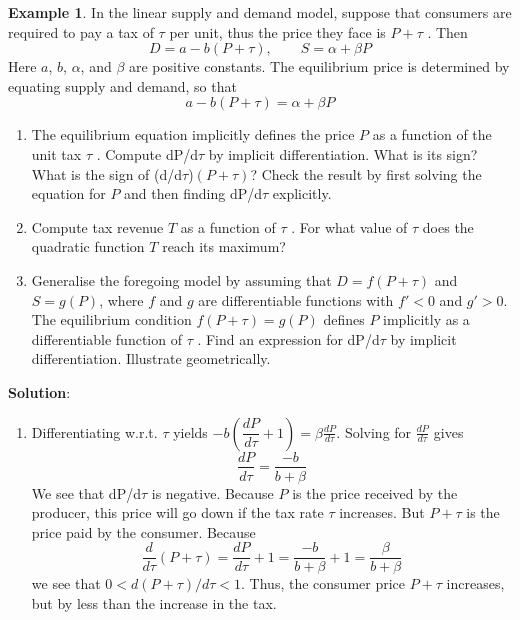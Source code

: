 \documentclass[10pt,a4paper]{book}
\theoremstyle{definition}\newtheorem{definition}{Definition}
\theoremstyle{definition}\newtheorem{fact}{Fact}
\theoremstyle{definition}\newtheorem{ex}{Ex.}
\theoremstyle{definition}\newtheorem{project}{Project}
\theoremstyle{definition}\newtheorem{problem}{Problem}
\theoremstyle{definition}\newtheorem{example}{Example}
\numberwithin{theorem}{chapter}
\numberwithin{corollary}{chapter}
\numberwithin{assumption}{chapter}
\numberwithin{definition}{chapter}
\numberwithin{prop}{chapter}
\numberwithin{notation}{chapter}
\numberwithin{problem}{chapter}
\numberwithin{example}{chapter}
\numberwithin{fact}{chapter}
\numberwithin{ex}{chapter}
\begin{document}
	\begin{example}
		In the linear supply and demand model, suppose that consumers
		are required to pay a tax of $\tau$ per unit, thus the price they face is $P + \tau$ . Then
		\begin{equation*}
			D=a-b(P+\tau), \qquad
			S=\alpha+\beta P
		\end{equation*}
		Here $a$, $b$, $\alpha$, and $\beta$ are positive constants. The equilibrium price is determined by equating supply and demand, so that
		$$a-b(P+\tau)=\alpha+\beta P$$
		\begin{enumerate}[label=(\alph*)]
			\item The equilibrium equation implicitly defines the price $P$ as a function of the unit tax $\tau$ . Compute dP/d$\tau$ by implicit differentiation. What is its sign? What is the sign of (d/d$\tau$)$(P + \tau )$? Check the result by first solving the equation for $P$ and then finding dP/d$\tau$ explicitly.
			\item Compute tax revenue $T$ as a function of $\tau$ . For what value of $\tau$ does the quadratic function $T$ reach its maximum?
			\item Generalise the foregoing model by assuming that $D = f (P + \tau )$ and $S = g(P)$, where $f$ and $g$ are differentiable functions with $f' < 0$ and $g' > 0$. The equilibrium condition $f (P + \tau ) = g(P)$ defines $P$ implicitly as a differentiable function of $\tau$ . Find an expression for dP/d$\tau$ by implicit differentiation. Illustrate geometrically.
		\end{enumerate}
		
		\textbf{Solution}:
		\begin{enumerate}[label=(\alph*)]
			\item Differentiating w.r.t. $\tau$ yields $-b \left( \dfrac{dP}{d\tau}+1 \right) = \beta \frac{dP}{d\tau}$. Solving for $\frac{dP}{d\tau}$ gives
			$$\frac{dP}{d\tau} = \frac{-b}{b+\beta}$$
			We see that dP/d$\tau$ is negative. Because $P$ is the price received by the producer, this price will go down if the tax rate $\tau$ increases. But $P + \tau$ is the price paid by the consumer.
			Because
			$$\frac{d}{d\tau}(P+\tau) = \frac{dP}{d\tau}+1 = \frac{-b}{b+\beta} + 1 = \frac{\beta}{b+\beta}$$
			we see that $0 < d(P + \tau)/d\tau < 1$. Thus, the consumer price $P+\tau$ increases, but by less than the increase in the tax.
			

\end{enumerate}
\end{example}
\end{document}

